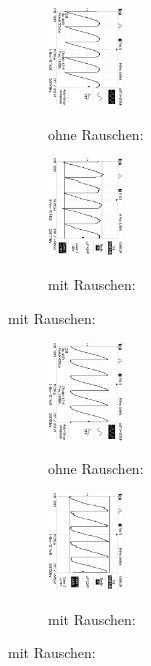 \begin{figure}
\caption{$U_{out} (\phi = 45°$) }
\begin{subfigure}{0.48\textwidth}
\centering
\caption*{ohne Rauschen:}
\includegraphics[angle=90,height=2.6cm]{graphics/ALL0037/F0037TEK.jpg}
\label{fig:phi45o}
\end{subfigure}
\begin{subfigure}{0.48\textwidth}
\centering
\caption*{mit Rauschen:}
\includegraphics[angle=90,height=2.6cm]{graphics/ALL0045/F0045TEK.jpg}
\label{fig:phi45m}
\end{subfigure}
\end{figure}
\addtocounter{figure}{-1}
\begin{figure}
\caption{$U_{out} (\phi = 90°$) }
\begin{subfigure}{0.48\textwidth}
\centering
\caption*{ohne Rauschen:}
\includegraphics[angle=90,height=2.6cm]{graphics/ALL0033/F0033TEK.jpg}
\label{fig:phi90o}
\end{subfigure}
\begin{subfigure}{0.48\textwidth}
\centering
\caption*{mit Rauschen:}
\includegraphics[angle=90,height=2.6cm]{graphics/ALL0041/F0041TEK.jpg}
\label{fig:phi90m}
\end{subfigure}
\end{figure}
\addtocounter{figure}{-1}
